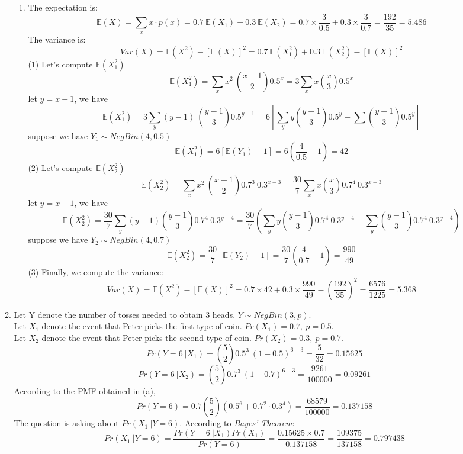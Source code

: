 \documentclass[11pt]{article}
\begin{document}
\begin{enumerate}[label=\textbf{Question \arabic*:},start=1]
\begin{enumerate}
\begin{enumerate}
    \item The expectation is:
\[
\mathbb{E}(X) = \sum_x x \cdot p(x) = 0.7 \  \mathbb{E}(X_1) + 0.3 \ \mathbb{E}(X_2) = 0.7 \times \frac{3}{0.5} + 0.3 \times \frac{3}{0.7} = \frac{192}{35} = 5.486
\]
The variance is:
\[
Var(X) = \mathbb{E}(X^2) - [\mathbb{E}(X)]^2 = 0.7 \ \mathbb{E}(X_1^2) + 0.3 \ \mathbb{E}(X_2^2) - [\mathbb{E}(X)]^2
\]
(1) Let's compute \(\mathbb{E}(X_1^2) \)
\[
\mathbb{E}(X_1^2) = \sum_x x^2 \ {x-1 \choose 2} 0.5^x = 3 \sum_x x {x \choose 3} 0.5^x
\]
let \( y = x + 1 \), we have 
\[
\mathbb{E}(X_1^2) = 3 \sum_y (y-1) \ {y-1 \choose 3} 0.5^{y-1} = 6 [\sum_y y {y-1 \choose 3} 0.5^y - \sum {y-1 \choose 3} 0.5^y]
\]
suppose we have \( Y_1 \sim NegBin(4, 0.5) \)
\[
\mathbb{E}(X_1^2) = 6 [\mathbb{E}(Y_1) - 1] = 6 (\frac{4}{0.5} - 1) = 42
\]
(2) Let's compute \(\mathbb{E}(X_2^2) \)
\[
\mathbb{E}(X_2^2) = \sum_x x^2 \ {x-1 \choose 2} 0.7^3 \ 0.3^{x-3} = \frac{30}{7} \sum_x x {x \choose 3} 0.7^4 \ 0.3^{x-3}
\]
let \( y = x + 1 \), we have 
\[
\mathbb{E}(X_2^2) = \frac{30}{7} \sum_y (y-1) {y-1 \choose 3} 0.7^4 \ 0.3^{y-4} = \frac{30}{7} (\sum_y y {y-1 \choose 3} 0.7^4 \ 0.3^{y-4} - \sum_y {y-1 \choose 3} 0.7^4 \ 0.3^{y-4})
\]
suppose we have \( Y_2 \sim NegBin(4, 0.7) \)
\[
\mathbb{E}(X_2^2) = \frac{30}{7} [\mathbb{E}(Y_2) - 1] = \frac{30}{7} (\frac{4}{0.7} - 1) = \frac{990}{49}
\]
(3) Finally, we compute the variance:
\[
Var(X) = \mathbb{E}(X^2) - [\mathbb{E}(X)]^2 = 0.7 \times 42 + 0.3 \times \frac{990}{49} - (\frac{192}{35})^2 = \frac{6576}{1225} = 5.368
\]


  \end{enumerate}

  \item Let Y denote the number of tosses needed to obtain 3 heads. \( Y \sim NegBin(3, p) \). \\
Let \( X_1 \) denote the event that Peter picks the first type of coin. \(Pr(X_1) = 0.7, \  p = 0.5.\) \\
Let \( X_2 \) denote the event that Peter picks the second type of coin. \( Pr(X_2) = 0.3, \ p = 0.7.\) \\
\[
Pr(Y=6 \ | X_1) = {5 \choose 2} 0.5^3 \ (1-0.5)^{6-3} = \frac{5}{32} = 0.15625
\]
\[
Pr(Y=6 \ | X_2) = {5 \choose 2} 0.7^3 \ (1-0.7)^{6-3} = \frac{9261}{100000} = 0.09261
\]
According to the PMF obtained in (a),
\[
Pr(Y = 6) = 0.7 {5 \choose 2} ( 0.5^6 + 0.7^2 \cdot 0.3^4 ) = \frac{68579}{100000} = 0.137158
\]
The question is asking about \( Pr(X_1 \ | Y = 6) \). According to \textit{Bayes' Theorem}:
\[
Pr(X_1 \ | Y = 6) = \frac{Pr(Y = 6 \  | X_1) Pr(X_1)}{Pr(Y = 6)} = \frac{0.15625 \times 0.7}{0.137158} = \frac{109375}{137158} = 0.797438
\]



\end{enumerate}
\end{enumerate}
\end{document}
